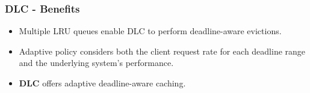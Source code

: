 \documentclass{beamer}
\newcommand{\myv}{\vspace{3 mm}}
\begin{document}
\begin{frame}
  \frametitle{DLC - Benefits}
  \vspace{-15 mm}
  \begin{itemize}
  \item Multiple LRU queues enable DLC to perform deadline-aware evictions.
    \myv
  \item Adaptive policy considers both the client request rate for each
    deadline range and the underlying system's performance.  \myv

  \item \textbf{DLC} offers adaptive deadline-aware caching.
  \end{itemize}
\end{frame}


\end{document}
